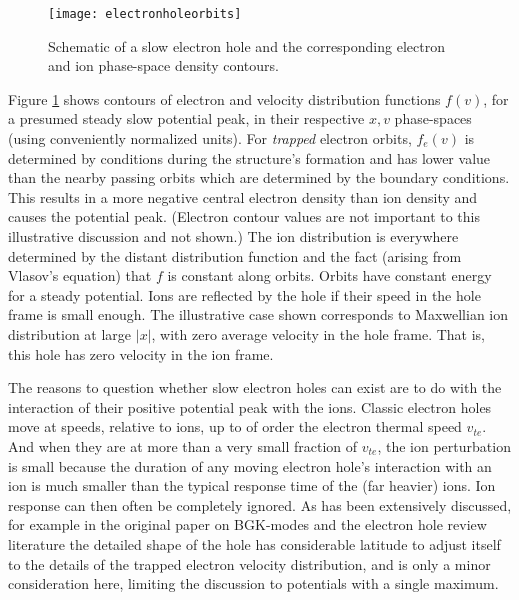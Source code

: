 \documentclass[pre]{revtex4-2}
\begin{document}
\begin{figure}[htp]
  \centering
  \texttt{[image: electronholeorbits]}
  \caption{Schematic of a slow electron hole and the corresponding
    electron and ion phase-space density contours.}
  \label{fig:electronholeorbits}
\end{figure}
Figure \ref{fig:electronholeorbits} shows contours of electron and
velocity distribution functions $f(v)$, for a presumed steady slow
potential peak, in their respective $x,v$ phase-spaces (using
conveniently normalized units). For \emph{trapped} electron orbits,
$f_e(v)$ is determined by conditions during the structure's formation
and has lower value than the nearby passing orbits which are
determined by the boundary conditions. This results in a more negative
central electron density than ion density and causes the potential
peak. (Electron contour values are not important to this illustrative
discussion and not shown.) The ion distribution is everywhere
determined by the distant distribution function and the fact (arising
from Vlasov's equation) that $f$ is constant along orbits. Orbits have
constant energy for a steady potential. Ions are reflected by
the hole if their speed in the hole frame is small enough. The
illustrative case shown corresponds to Maxwellian ion distribution at
large $|x|$, with zero average velocity in the hole frame. That is,
this hole has zero velocity in the ion frame.

The reasons to question whether slow electron holes can exist are to
do with the interaction of their positive potential peak with the
ions. Classic electron holes move at speeds, relative to ions, up to
of order the electron thermal speed
$v_{te}$\cite{Schamel1986a,Hutchinson2017}. And when they are at more
than a very small fraction of $v_{te}$, the ion perturbation is small
because the duration of any moving electron hole's interaction with an
ion is much smaller than the typical response time of the (far
heavier) ions. Ion response can then often be completely ignored. As
has been extensively discussed, for example in the original paper on
BGK-modes\cite{Bernstein1957} and the electron hole review
literature\cite{Hutchinson2017} the detailed shape of the hole has
considerable latitude to adjust itself to the details of the trapped
electron velocity distribution, and is only a minor consideration here,
limiting the discussion to potentials with a single maximum.
\end{document}
